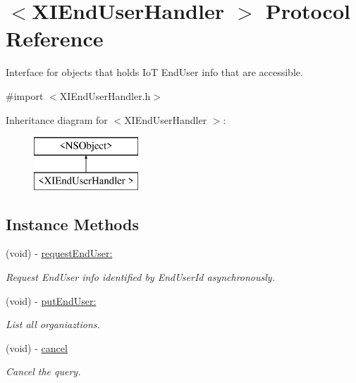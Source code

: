 \hypertarget{protocol_x_i_end_user_handler_01-p}{}\section{$<$X\+I\+End\+User\+Handler $>$ Protocol Reference}
\label{protocol_x_i_end_user_handler_01-p}


Interface for objects that holds IoT End\+User info that are accessible.  




{\ttfamily \#import $<$X\+I\+End\+User\+Handler.\+h$>$}

Inheritance diagram for $<$X\+I\+End\+User\+Handler $>$\+:\begin{figure}[H]
\begin{center}
\leavevmode
\includegraphics[height=2.000000cm]{protocol_x_i_end_user_handler_01-p}
\end{center}
\end{figure}
\subsection*{Instance Methods}
\begin{DoxyCompactItemize}
\item 
(void) -\/ \hyperlink{protocol_x_i_end_user_handler_01-p_a34bef6e14c8ebcfb2938939d4546b9bb}{request\+End\+User\+:}
\begin{DoxyCompactList}\small\item\em Request End\+User info identified by End\+User\+Id asynchronously. \end{DoxyCompactList}\item 
(void) -\/ \hyperlink{protocol_x_i_end_user_handler_01-p_a61ca66b7f1ed59f8f2ccf0d082375f4e}{put\+End\+User\+:}
\begin{DoxyCompactList}\small\item\em List all organiaztions. \end{DoxyCompactList}\item 
(void) -\/ \hyperlink{protocol_x_i_end_user_handler_01-p_ade5d51576841aee618b7e573dc889907}{cancel}
\begin{DoxyCompactList}\small\item\em Cancel the query. \end{DoxyCompactList}\end{DoxyCompactItemize}
